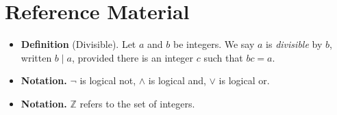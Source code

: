 \documentclass[11pt]{article}
\begin{document}
\section*{Reference Material}

\begin{itemize}
\item \textbf{Definition} (Divisible). Let $a$ and $b$ be integers. We say $a$ is \textit{divisible} by $b$, written $b \mid a$, provided there is an integer $c$ such that $bc=a$.
\item \textbf{Notation.}  $\lnot$ is logical not, $\land$ is logical and, $\lor$ is logical or.
\item \textbf{Notation.}  $\mathbb{Z}$ refers to the set of integers.
\end{itemize}
\end{document}
